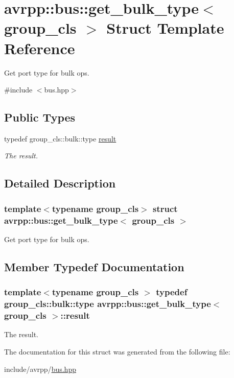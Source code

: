 \hypertarget{structavrpp_1_1bus_1_1get__bulk__type}{
\section{avrpp::bus::get\_\-bulk\_\-type$<$ group\_\-cls $>$ Struct Template Reference}
\label{structavrpp_1_1bus_1_1get__bulk__type}
}


Get port type for bulk ops.  




{\ttfamily \#include $<$bus.hpp$>$}

\subsection*{Public Types}
\begin{DoxyCompactItemize}
\item 
typedef group\_\-cls::bulk::type \hyperlink{structavrpp_1_1bus_1_1get__bulk__type_adb6587abb9c3f1b59b2ea2dbc133a527}{result}
\begin{DoxyCompactList}\small\item\em The result. \item\end{DoxyCompactList}\end{DoxyCompactItemize}


\subsection{Detailed Description}
\subsubsection*{template$<$typename group\_\-cls$>$ struct avrpp::bus::get\_\-bulk\_\-type$<$ group\_\-cls $>$}

Get port type for bulk ops. 

\subsection{Member Typedef Documentation}
\hypertarget{structavrpp_1_1bus_1_1get__bulk__type_adb6587abb9c3f1b59b2ea2dbc133a527}{
\subsubsection[{result}]{\setlength{\rightskip}{0pt plus 5cm}template$<$typename group\_\-cls $>$ typedef group\_\-cls::bulk::type {\bf avrpp::bus::get\_\-bulk\_\-type}$<$ group\_\-cls $>$::{\bf result}}}
\label{structavrpp_1_1bus_1_1get__bulk__type_adb6587abb9c3f1b59b2ea2dbc133a527}


The result. 



The documentation for this struct was generated from the following file:\begin{DoxyCompactItemize}
\item 
include/avrpp/\hyperlink{bus_8hpp}{bus.hpp}\end{DoxyCompactItemize}
